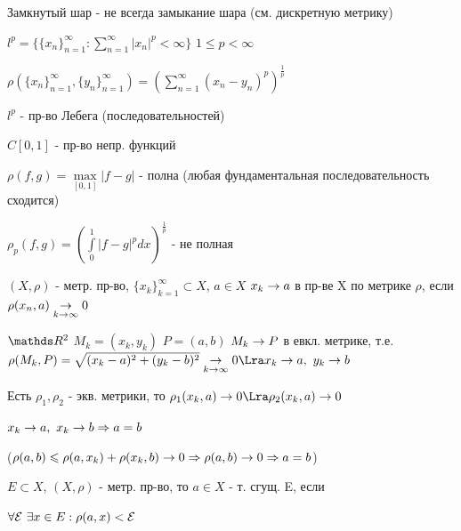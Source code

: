 \documentclass[main]{subfiles}
\begin{document}
  \begin{upr}
      Замкнутый шар - не всегда замыкание шара (см. дискретную метрику)
  \end{upr}

  \begin{example}
      $l^p=\{ \{x_n\}_{n=1}^\infty: \sum\limits_{n=1}^\infty |x_n|^p < \infty \}$ $1 \leqslant p < \infty$

      $\rho(\{x_n\}_{n=1}^\infty, \{y_n\}_{n=1}^\infty) = (\sum\limits_{n=1}^\infty (x_n-y_n)^p)^{\frac{1}{p}}$

      $l^p$ - пр-во Лебега (последовательностей)
  \end{example}

  \begin{example}
      $C[0,1]$ - пр-во непр. функций

      $\rho(f,g)=\max\limits_{[0,1]} |f-g|$ - полна (любая фундаментальная последовательность сходится)

      $\rho_p(f,g)=(\int\limits_0^1 |f-g|^p dx)^{\frac{1}{p}}$ - не полная
  \end{example}

  \begin{definition}
      $(X, \rho)$ - метр. пр-во, $\{x_k\}_{k=1}^\infty \subset X$, $a \in X$ $x_k \rightarrow a$ в пр-ве X по метрике $\rho$, если $\rho(x_n,a) \underset{k \rightarrow \infty}{\rightarrow} 0$
  \end{definition}

  \begin{examples}
      $\R^2$ $M_k=(x_k, y_k)$ $P=(a,b)$ $M_k \rightarrow P$ в евкл. метрике, т.е. $\rho(M_k,P)=\sqrt{(x_k-a)^2+(y_k-b)^2} \us{k \ra \infty}{\ra} 0 \Lra x_k \ra a,\ y_k \ra b$
  \end{examples}

  \begin{remark}
      Есть $\rho_1,\rho_2$ - экв. метрики, то $\rho_1(x_k,a) \ra 0 \Lra \rho_2(x_k,a) \ra 0$
  \end{remark}

  \begin{upr}
      $x_k \rightarrow a,\ x_k \rightarrow b \Rightarrow a=b$

      ($\rho(a,b) \leqslant \rho(a, x_k) + \rho(x_k,b) \rightarrow 0 \Rightarrow \rho (a,b) \rightarrow 0 \Rightarrow a=b$)
  \end{upr}

  \begin{definition}
      $E \subset X$, $(X, \rho)$ - метр. пр-во, то $a \in X$ - т. сгущ. E, если

      $\forall \mathcal{E} \ \exists x \in E: \rho(a,x) < \mathcal{E}$
  \end{definition}
\end{document}
